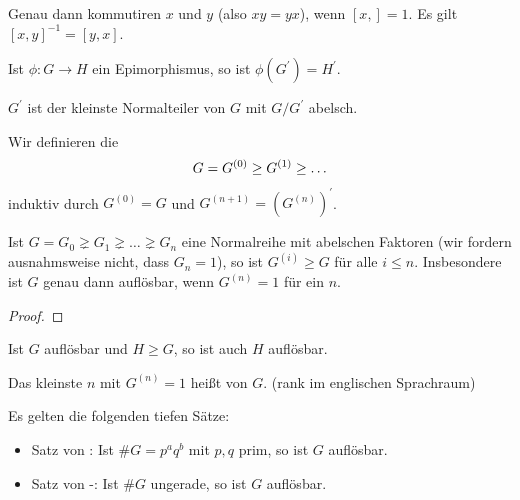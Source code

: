 \begin{remark}
	Genau dann kommutiren $x$ und $y$ (also $xy = yx$), wenn $[x,] = 1$. Es gilt $[x,y]^{-1} = [y,x]$.
\end{remark}

\begin{lemma}
	Ist $\phi: G \to H$ ein Epimorphismus, so ist $\phi(G^{'}) = H^{'}$.
\end{lemma}

\begin{lemma}
	$G^{'}$ ist der kleinste Normalteiler von $G$ mit $G/G^{'}$ abelsch.
\end{lemma}

\begin{definition}[Kommutatorreihe]
	Wir definieren die 
	\begin{align}
	G = G^{(0)} \geq G^{(1)} \geq \dots\notag
	\end{align}
	induktiv durch $G^{(0)} = G$ und $G^{(n+1)} = (G^{(n)})^{'}$.
\end{definition}

\begin{proposition}
	Ist $G = G_0 \gneq G_1 \gneq \dots \gneq G_n$ eine Normalreihe mit abelschen Faktoren (wir fordern ausnahmsweise nicht, dass $G_n = 1$), so ist $G^{(i)} \geq G$ für alle $i \leq n$. Insbesondere ist $G$ genau dann auflösbar, wenn $G^{(n)} = 1$ für ein $n$.
\end{proposition}

\begin{proof}
	
\end{proof}

\begin{conclusion}
	Ist $G$ auflösbar und $H \geq G$, so ist auch $H$ auflösbar.
\end{conclusion}

\begin{remark}
	Das kleinste $n$ mit $G^{(n)} = 1$ heißt  von $G$. (rank im englischen Sprachraum)
\end{remark}

\begin{remark}
	Es gelten die folgenden tiefen Sätze:
	\begin{itemize}
		\item Satz von : Ist $\#G = p^{a}q^{b}$ mit $p,q$ prim, so ist $G$ auflösbar.
		\item Satz von -: Ist $\#G$ ungerade, so ist $G$ auflösbar.
	\end{itemize}
\end{remark}